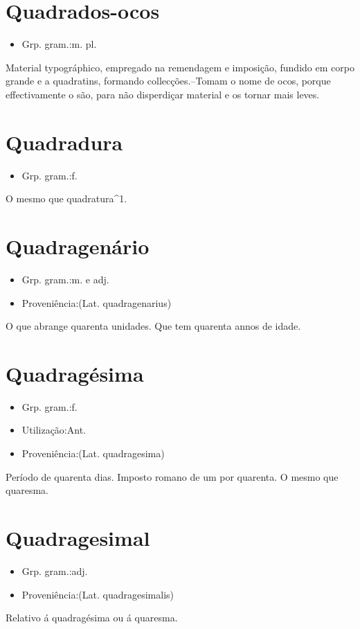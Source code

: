 \section{Quadrados-ocos}
\begin{itemize}
\item {Grp. gram.:m. pl.}
\end{itemize}
Material typográphico, empregado na remendagem e imposição, fundido em corpo grande e a quadratins, formando collecções.--Tomam o nome de ocos, porque effectivamente o são, para não disperdiçar material e os tornar mais leves.
\section{Quadradura}
\begin{itemize}
\item {Grp. gram.:f.}
\end{itemize}
O mesmo que \textunderscore quadratura\textunderscore ^1.
\section{Quadragenário}
\begin{itemize}
\item {Grp. gram.:m.  e  adj.}
\end{itemize}
\begin{itemize}
\item {Proveniência:(Lat. \textunderscore quadragenarius\textunderscore )}
\end{itemize}
O que abrange quarenta unidades.
Que tem quarenta annos de idade.
\section{Quadragésima}
\begin{itemize}
\item {Grp. gram.:f.}
\end{itemize}
\begin{itemize}
\item {Utilização:Ant.}
\end{itemize}
\begin{itemize}
\item {Proveniência:(Lat. \textunderscore quadragesima\textunderscore )}
\end{itemize}
Período de quarenta dias.
Imposto romano de um por quarenta.
O mesmo que \textunderscore quaresma\textunderscore .
\section{Quadragesimal}
\begin{itemize}
\item {Grp. gram.:adj.}
\end{itemize}
\begin{itemize}
\item {Proveniência:(Lat. \textunderscore quadragesimalis\textunderscore )}
\end{itemize}
Relativo á quadragésima ou á quaresma.
